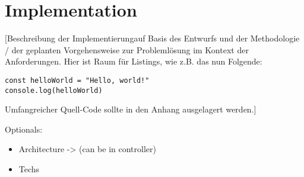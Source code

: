 \chapter{Implementation}

[Beschreibung der Implementierung\footnotemark auf Basis des Entwurfs und der Methodologie / der geplanten Vorgehensweise zur Probleml\"osung im Kontext der Anforderungen. Hier ist Raum f\"ur Listings, wie z.B. das nun Folgende:



\begin{lstlisting}[caption={Ein Beispiel: Hello World (JavaScript)}]
const helloWorld = "Hello, world!"
console.log(helloWorld)
\end{lstlisting}

Umfangreicher Quell-Code sollte in den Anhang ausgelagert werden.]





Optionals:
\begin{itemize}
  \item Architecture -> (can be in controller)
  \item Techs 
\end{itemize}